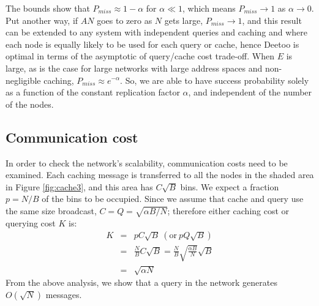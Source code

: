\documentclass[9.5pt,journal,final,finalsubmission,twocolumn]{IEEEtran}
\begin{document}

\fi

The bounds show that $P_{miss} \approx 1 - \alpha$ for $\alpha \ll 1$,
which means $P_{miss} \rightarrow 1$ as $\alpha \rightarrow 0$.
Put another way, if $AN$ goes to zero as $N$ gets large, $P_{miss}\rightarrow 1$,
and this result can be extended to any system with independent queries and
caching and where each node is equally likely to be used for each query or
cache, hence Deetoo is optimal in terms of the asymptotic of query/cache cost
trade-off.
When $E$ is large, as is the case for large networks with large address
spaces and non-negligible caching, $P_{miss}\approx e^{-\alpha}$.
So, we are able to have success probability solely as a function of the 
constant replication factor $\alpha$, and 
independent of the number of the nodes. 

\subsection{Communication cost}
\label{sec:cost}
In order to check the network's scalability, communication costs
need to be examined. Each caching message is transferred to all the
nodes in the shaded area in Figure \ref{fig:cache3}, and this area has
$C\sqrt{B}$ bins.
We expect a fraction $p=N/B$ of the bins to be occupied.
Since we assume that cache and query use the same size broadcast,
$C = Q = \sqrt{\alpha B/N}$; therefore either caching cost or querying cost $K$ is:
\begin{eqnarray*}\label{th}
K &=& pC\sqrt{B} \  (\mathrm{or}\  pQ\sqrt{B})\\
  &=& \frac{N}{B}C\sqrt{B} = \frac{N}{B}\sqrt{\frac{\alpha B}{N}}\sqrt{B}\\
  &=& \sqrt{\alpha N}
\end{eqnarray*}
From the above analysis, we show that a query in the network
generates $O(\sqrt{N})$ messages.
\end{document}
